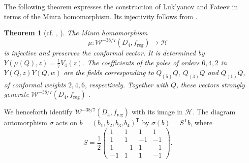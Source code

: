 \documentclass[11pt]{amsart}
\numberwithin{equation}{section}
\newtheorem{theorem}{Theorem}[section]
\theoremstyle{definition}
\theoremstyle{remark}
\newcommand{\W}{\mathcal W}
\newcommand{\reg}{\mathrm{reg}}
\begin{document}
The following theorem expresses the construction of Luk'yanov and
Fateev \cite{LF} in terms of the Miura homomorphism.
Its injectivity follows from \cite[Section~5]{ACL}.
\begin{theorem} [cf. \cite{LF}, \cite{ACL}] \label{thm:miura-D4}
The Miura homomorphism
\[
 \mu:\W^{-38/7}(D_4,f_{\reg})\longrightarrow\mathcal H
\]
is injective and preserves the conformal vector. It is determined by
$Y(\mu(Q),z)=\tfrac17 V_4(z)$.
The coefficients of the poles of orders $6,4,2$ in $Y(Q,z)Y(Q,w)$
are the fields corresponding to $Q_{(5)}Q$, $Q_{(3)}Q$ and
$Q_{(1)}Q$, of conformal weights $2,4,6$, respectively. 
Together with $Q$, these vectors strongly generate
$\W^{-38/7}(D_4,f_{\reg})$ \cite[(3.16)--(3.18)]{IZ}.
\end{theorem}


We henceforth identify $\W^{-38/7}(D_4,f_{\reg})$ with its image
in $\mathcal H$.
The diagram automorphism $\sigma$ acts on
$b=(b_1,b_2,b_3,b_4)^{\mathsf T}$ by $\sigma(b)=S^{\mathsf T}b$, where
\[
 S=\frac12\begin{pmatrix}
  1& 1& 1& 1\\
  1& 1&-1&-1\\
  1&-1& 1&-1\\
 -1& 1& 1&-1
 \end{pmatrix}.
\]
\end{document}

